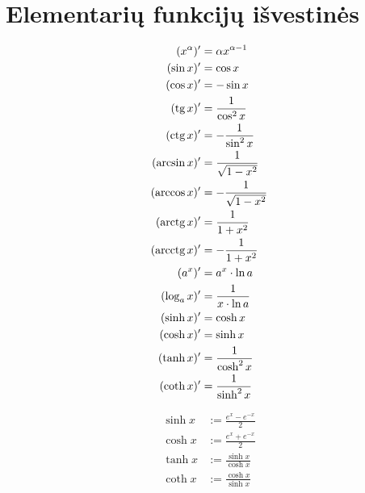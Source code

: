 \section{Elementarių funkcijų išvestinės}

\label{dx_formulynas}

\begin{align}
%
  (x^{\alpha})' &= \alpha x^{\alpha - 1}
  \label{dx_laipsnine} \\
%
  (\sin x)' &= \cos x
  \label{dx_sin} \\
%
  (\cos x)' &= - \sin x
  \label{dx_cos} \\
%
  (\tg x)' &= \frac{1}{\cos^{2} x}
  \label{dx_tg} \\
%
  (\ctg x)' &= - \frac{1}{\sin^{2} x}
  \label{dx_ctg} \\
%
  (\arcsin x)' &= \frac{1}{\sqrt{1 - x^{2}}}
  \label{dx_arcsin} \\
%
  (\arccos x)' &= - \frac{1}{\sqrt{1 - x^{2}}}
  \label{dx_arccos} \\
%
  (\arctg x)' &= \frac{1}{1 + x^{2}}
  \label{dx_arctg} \\
%
  (\arcctg x)' &= - \frac{1}{1 + x^{2}}
  \label{dx_arcctg} \\
%
  (a^{x})' &= a^{x} \cdot \ln a
  \label{dx_expo} \\
%
  (\log _{a} x)' &= \frac{1}{x \cdot \ln a}
  \label{dx_log} \\
%
  (\sinh x)' &= \cosh x
  \label{dx_sh} \\
%
  (\cosh x)' &= \sinh x
  \label{dx_ch} \\
% 
  (\tanh x)' &= \frac{1}{\cosh^{2} x}
  \label{dx_th} \\
%
  (\coth x)' &= \frac{1}{\sinh^{2} x}
  \label{dx_cth}
\end{align}

\begin{note}
  \begin{align*}
    \sinh x &:= \frac{e^{x} - e^{-x}}{2} \\
    \cosh x &:= \frac{e^{x} + e^{-x}}{2} \\
    \tanh x &:= \frac{\sinh x}{\cosh x} \\
    \coth x &:= \frac{\cosh x}{\sinh x}
  \end{align*}
\end{note}
